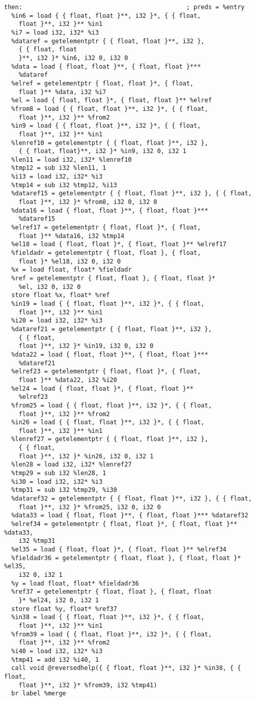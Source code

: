 \documentclass[main.tex]{subfiles}
\begin{document}
{\begin{lstlisting}
then:                                             ; preds = %entry
  %in6 = load { { float, float }**, i32 }*, { { float,
    float }**, i32 }** %in1
  %i7 = load i32, i32* %i3
  %dataref = getelementptr { { float, float }**, i32 },
    { { float, float 
    }**, i32 }* %in6, i32 0, i32 0
  %data = load { float, float }**, { float, float }***
    %dataref
  %elref = getelementptr { float, float }*, { float, 
    float }** %data, i32 %i7
  %el = load { float, float }*, { float, float }** %elref
  %from8 = load { { float, float }**, i32 }*, { { float,
    float }**, i32 }** %from2
  %in9 = load { { float, float }**, i32 }*, { { float,
    float }**, i32 }** %in1
  %lenref10 = getelementptr { { float, float }**, i32 },
    { { float, float}**, i32 }* %in9, i32 0, i32 1
  %len11 = load i32, i32* %lenref10
  %tmp12 = sub i32 %len11, 1
  %i13 = load i32, i32* %i3
  %tmp14 = sub i32 %tmp12, %i13
  %dataref15 = getelementptr { { float, float }**, i32 }, { { float, 
    float }**, i32 }* %from8, i32 0, i32 0
  %data16 = load { float, float }**, { float, float }***
    %dataref15
  %elref17 = getelementptr { float, float }*, { float, 
    float }** %data16, i32 %tmp14
  %el18 = load { float, float }*, { float, float }** %elref17
  %fieldadr = getelementptr { float, float }, { float, 
    float }* %el18, i32 0, i32 0
  %x = load float, float* %fieldadr
  %ref = getelementptr { float, float }, { float, float }*
    %el, i32 0, i32 0
  store float %x, float* %ref
  %in19 = load { { float, float }**, i32 }*, { { float, 
    float }**, i32 }** %in1
  %i20 = load i32, i32* %i3
  %dataref21 = getelementptr { { float, float }**, i32 },
    { { float, 
    float }**, i32 }* %in19, i32 0, i32 0
  %data22 = load { float, float }**, { float, float }***
    %dataref21
  %elref23 = getelementptr { float, float }*, { float, 
    float }** %data22, i32 %i20
  %el24 = load { float, float }*, { float, float }** 
    %elref23
  %from25 = load { { float, float }**, i32 }*, { { float, 
    float }**, i32 }** %from2
  %in26 = load { { float, float }**, i32 }*, { { float,
    float }**, i32 }** %in1
  %lenref27 = getelementptr { { float, float }**, i32 },
    { { float, 
    float }**, i32 }* %in26, i32 0, i32 1
  %len28 = load i32, i32* %lenref27
  %tmp29 = sub i32 %len28, 1
  %i30 = load i32, i32* %i3
  %tmp31 = sub i32 %tmp29, %i30
  %dataref32 = getelementptr { { float, float }**, i32 }, { { float, 
    float }**, i32 }* %from25, i32 0, i32 0
  %data33 = load { float, float }**, { float, float }*** %dataref32
  %elref34 = getelementptr { float, float }*, { float, float }** %data33, 
    i32 %tmp31
  %el35 = load { float, float }*, { float, float }** %elref34
  %fieldadr36 = getelementptr { float, float }, { float, float }* %el35, 
    i32 0, i32 1
  %y = load float, float* %fieldadr36
  %ref37 = getelementptr { float, float }, { float, float 
    }* %el24, i32 0, i32 1
  store float %y, float* %ref37
  %in38 = load { { float, float }**, i32 }*, { { float, 
    float }**, i32 }** %in1
  %from39 = load { { float, float }**, i32 }*, { { float, 
    float }**, i32 }** %from2
  %i40 = load i32, i32* %i3
  %tmp41 = add i32 %i40, 1
  call void @reversedhelp({ { float, float }**, i32 }* %in38, { { float, 
    float }**, i32 }* %from39, i32 %tmp41)
  br label %merge


\end{lstlisting}}
\end{document}
